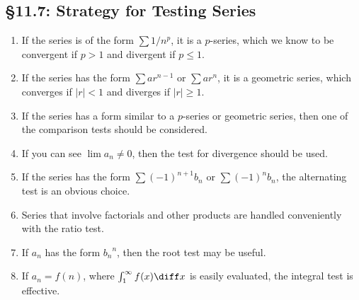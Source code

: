 \subsection*{\S 11.7: Strategy for Testing Series}
\begin{enumerate}[label=\textbf{\arabic*.}]
\item If the series is of the form $\sum 1/n^p$, it is a $p$-series, which
  we know to be convergent if $p>1$ and divergent if $p\leq 1$.
\item If the series has the form $\sum ar^{n-1}$ or $\sum ar^n$, it is a
  geometric series, which converges if $|r|<1$ and diverges if $|r|\geq
  1$.
\item If the series has a form similar to a $p$-series or geometric series,
  then one of the comparison tests should be considered.
\item If you can see $\lim a_n\neq 0$, then the test for divergence should
  be used.
\item If the series has the form $\sum(-1)^{n+1} b_n$ or $\sum (-1)^n b_n$,
  the alternating test is an obvious choice.
\item Series that involve factorials and other products are handled
  conveniently with the ratio test.
\item If $a_n$ has the form ${b_n}^n$, then the root test may be useful.
\item If $a_n=f(n)$, where $\int_1^\infty f(x)\diff x$ is easily evaluated,
  the integral test is effective.
\end{enumerate}
